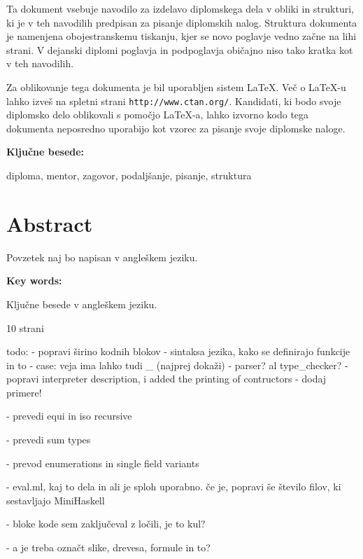 \documentclass[12pt,a4paper,openany]{book}
\begin{document}
Ta dokument vsebuje navodilo za izdelavo diplomskega dela v obliki in strukturi, ki je v teh navodilih predpisan za
pisanje diplomskih nalog. Struktura dokumenta je namenjena obojestranskemu tiskanju, kjer se novo poglavje vedno za\v cne na lihi strani.
V dejanski diplomi poglavja in podpogla\-vja  obi\v cajno niso tako kratka kot v teh navodilih.

Za oblikovanje tega dokumenta je bil uporabljen sistem \LaTeX.
Ve\v c o \LaTeX-u lahko izve\v s na spletni strani \texttt{http://www.ctan.org/}.
Kandidati, ki bodo svoje diplomsko delo oblikovali s pomo\v cjo
\LaTeX-a, lahko izvorno kodo tega dokumenta neposredno uporabijo kot vzorec za pisanje svoje diplomske naloge.

\vspace{1.3cm}
\noindent
{\large \bf Ključne besede:}

\vspace{0.5cm}
\noindent
diploma, mentor, zagovor, podaljšanje, pisanje, struktura


\chapter*{Abstract}


Povzetek naj bo napisan v angleškem jeziku.

\vspace{1.3cm}
\noindent
{\large \bf Key words:}

\vspace{0.5cm}
\noindent
Ključne besede v angleškem jeziku.


10 strani

todo: 
- popravi širino kodnih blokov 
- sintaksa jezika, kako se definirajo funkcije in to
- case: veja ima lahko tudi _ (najprej dokaži) - parser? al type_checker?
- popravi interpreter description, i added the printing of contructors
- dodaj primere!

- prevedi equi in iso recursive

- prevedi sum types

- prevod enumerations in single field variants

- eval.ml, kaj to dela in ali je sploh uporabno. če je, popravi še število filov, ki sestavljajo MiniHaskell

- bloke kode sem zaključeval z ločili, je to kul?

- a je treba označt slike, drevesa, formule in to?
\end{document}
